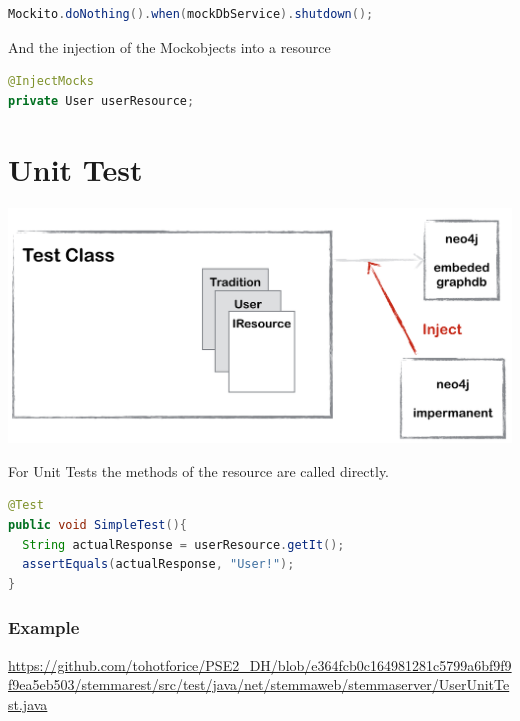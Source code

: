 \documentclass[11pt,fleqn,openany]{book} %
\begin{document}
\begin{lstlisting}[language=java]
Mockito.doNothing().when(mockDbService).shutdown();
\end{lstlisting}

And the injection of the Mockobjects into a resource

\begin{lstlisting}[language=java]
@InjectMocks
private User userResource;
\end{lstlisting}



\chapter{Unit Test}

\begin{center}
\includegraphics[scale=.4]{Pictures/junitoverview.png}
\end{center} 
 
For Unit Tests the methods of the resource are called directly.
\begin{lstlisting}[language=java]
@Test
public void SimpleTest(){
  String actualResponse = userResource.getIt();
  assertEquals(actualResponse, "User!");
}
\end{lstlisting}


\subsection*{Example}
\url{https://github.com/tohotforice/PSE2_DH/blob/e364fcb0c164981281c5799a6bf9f9f9ea5eb503/stemmarest/src/test/java/net/stemmaweb/stemmaserver/UserUnitTest.java}
\end{document}
